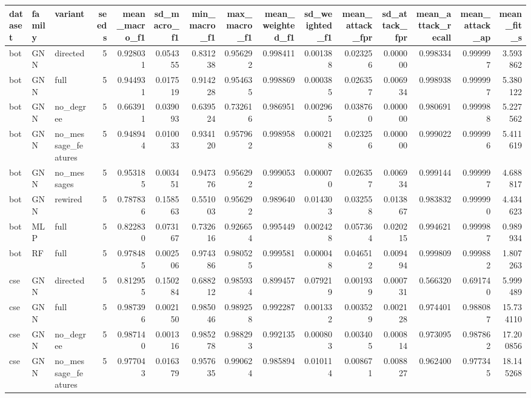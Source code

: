 \begin{tabular}{lllrrrrrrrrrrrr}
\toprule
dataset & family & variant & seeds & mean\_macro\_f1 & sd\_macro\_f1 & min\_macro\_f1 & max\_macro\_f1 & mean\_weighted\_f1 & sd\_weighted\_f1 & mean\_attack\_fpr & sd\_attack\_fpr & mean\_attack\_recall & mean\_attack\_ap & mean\_fit\_s \\
\midrule
bot & GNN & directed & 5 & 0.928031 & 0.054355 & 0.831238 & 0.956292 & 0.998411 & 0.001388 & 0.023256 & 0.000000 & 0.998334 & 0.999997 & 3.593862 \\
bot & GNN & full & 5 & 0.944931 & 0.017519 & 0.914228 & 0.954635 & 0.998869 & 0.000385 & 0.026357 & 0.006934 & 0.998938 & 0.999997 & 5.380122 \\
bot & GNN & no\_degree & 5 & 0.663911 & 0.039093 & 0.639524 & 0.732616 & 0.986951 & 0.002965 & 0.038760 & 0.000000 & 0.980691 & 0.999988 & 5.227562 \\
bot & GNN & no\_message\_features & 5 & 0.948944 & 0.010033 & 0.934120 & 0.957962 & 0.998958 & 0.000218 & 0.023256 & 0.000000 & 0.999022 & 0.999996 & 5.411619 \\
bot & GNN & no\_messages & 5 & 0.953185 & 0.003451 & 0.947376 & 0.956292 & 0.999053 & 0.000070 & 0.026357 & 0.006934 & 0.999144 & 0.999997 & 4.688817 \\
bot & GNN & rewired & 5 & 0.787836 & 0.158563 & 0.551003 & 0.956292 & 0.989640 & 0.014303 & 0.032558 & 0.013867 & 0.983832 & 0.999990 & 4.434623 \\
bot & MLP & full & 5 & 0.822830 & 0.073167 & 0.732616 & 0.926654 & 0.995449 & 0.002428 & 0.057364 & 0.020215 & 0.994621 & 0.999987 & 0.989934 \\
bot & RF & full & 5 & 0.978485 & 0.002506 & 0.974386 & 0.980525 & 0.999581 & 0.000048 & 0.046512 & 0.009494 & 0.999809 & 0.999882 & 1.807263 \\
cse & GNN & directed & 5 & 0.812955 & 0.150284 & 0.688212 & 0.985934 & 0.899457 & 0.079219 & 0.001939 & 0.000731 & 0.566320 & 0.691740 & 5.999489 \\
cse & GNN & full & 5 & 0.987396 & 0.002150 & 0.985046 & 0.989258 & 0.992287 & 0.001332 & 0.003529 & 0.002128 & 0.974401 & 0.988087 & 15.734110 \\
cse & GNN & no\_degree & 5 & 0.987140 & 0.001316 & 0.985278 & 0.988293 & 0.992135 & 0.000803 & 0.003405 & 0.000814 & 0.973095 & 0.987862 & 17.200856 \\
cse & GNN & no\_message\_features & 5 & 0.977043 & 0.016379 & 0.957635 & 0.990624 & 0.985894 & 0.010114 & 0.008671 & 0.008827 & 0.962400 & 0.977345 & 18.145268 \\

\end{tabular}
